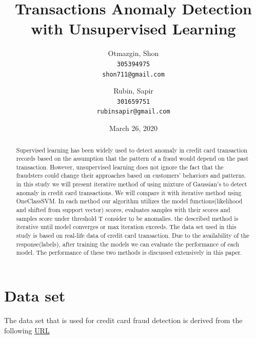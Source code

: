 \documentclass[20pt,a4paper]{article}
\begin{document}
\title{Transactions Anomaly Detection with Unsupervised Learning }

\author{
          Otmazgin, Shon\\
          \texttt{305394975}\\
          \texttt{shon711@gmail.com}
          \and
          Rubin, Sapir\\
          \texttt{301659751}\\
          \texttt{rubinsapir@gmail.com}
          }
\date{March 26, 2020}
\maketitle
% 

\begin{abstract}
    Supervised learning has been widely used to detect anomaly in credit
    card transaction records based on the assumption that the pattern of a
    fraud would depend on the past transaction. However, unsupervised
    learning does not ignore the fact that the fraudsters could change their
    approaches based on customers' behaviors and patterns. in this study we
    will present iterative method of using mixture of Gaussian's to detect
    anomaly in credit card transactions. We will compare it with iterative
    method using OneClassSVM. In each method our algorithm utilizes the
    model functions(likelihood and shifted from support vector) scores,
    evaluates samples with their scores and samples score under threshold T
    consider to be anomalies. the described method is iterative until model
    converges or max iteration exceeds. The data set used in this study is
    based on real-life data of credit card transaction. Due to the
    availability of the response(labels), after training the models we can
    evaluate the performance of each model. The performance of these two
    methods is discussed extensively in this paper.
\end{abstract}

\section{Data set}
    The data set that is used for credit card fraud detection is derived from
    the following
    \href{https://eur02.safelinks.protection.outlook.com/?url=https\%3A\%2F\%2Fdata.world\%2Fraghu543\%2Fcredit-card-fraud-data\&data=02\%7C01\%7CYael.Madar\%40biu.ac.il\%7Cb48189911f224aef8c2e08d79ff0c5e6\%7C61234e145b874b67ac198feaa8ba8f12\%7C0\%7C0\%7C637153728776732928\&sdata=tzNpfPA2qlY12Dp1Zli5FW5ugw0Q05OaTCay5mAvo4c\%3D\&reserved=0}{URL}
    
\end{document}
